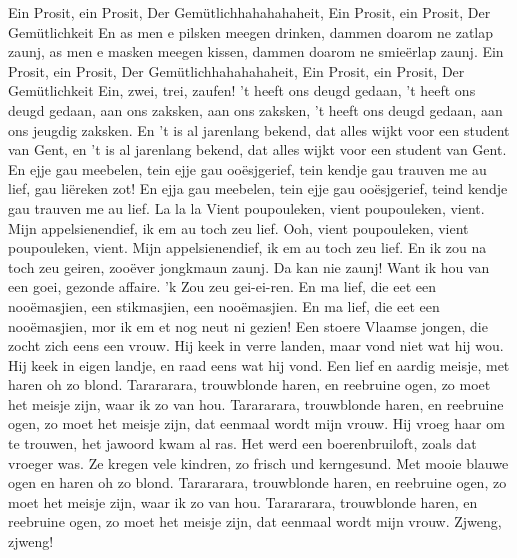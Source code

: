 \beginverse*
Ein Prosit, ein Prosit,
Der Gemütlichhahahahaheit,
Ein Prosit, ein Prosit,
Der Gemütlichkeit
\endverse
\beginverse*
En as men e pilsken meegen drinken,
dammen doarom ne zatlap zaunj,
as men e masken meegen kissen,
dammen doarom ne smieërlap zaunj.
\endverse
\beginchorus
Ein Prosit, ein Prosit,
Der Gemütlichhahahahaheit,
Ein Prosit, ein Prosit,
Der Gemütlichkeit
\endchorus
\beginverse*
Ein, zwei, trei, zaufen!
\endverse
\beginverse*
 't heeft ons deugd gedaan,
't heeft ons deugd gedaan,
aan ons zaksken,
aan ons zaksken,
't heeft ons deugd gedaan,
aan ons jeugdig zaksken.
\endverse
\beginverse*
En 't is al jarenlang bekend,
dat alles wijkt voor een student van Gent,
en 't is al jarenlang bekend,
dat alles wijkt voor een student van Gent.
\endverse
\beginverse*
En ejje gau meebelen,
tein ejje gau ooësjgerief,
tein kendje gau trauven me au lief,
gau liëreken zot!
En ejja gau meebelen,
tein ejje gau ooësjgerief,
teind kendje gau trauven me au lief.
\endverse
\beginverse*
La la la
\endverse
\beginverse*
Vient poupouleken,
vient poupouleken, vient.
Mijn appelsienendief,
ik em au toch zeu lief.
Ooh, vient poupouleken,
vient poupouleken, vient.
Mijn appelsienendief,
ik em au toch zeu lief.
\endverse
\beginverse*
En ik zou na toch zeu geiren,
zooëver jongkmaun zaunj.
Da kan nie zaunj!
Want ik hou van een goei,
gezonde affaire.
'k Zou zeu gei-ei-ren.
\endverse
\beginverse*
En ma lief, die eet een nooëmasjien,
een stikmasjien, een nooëmasjien.
En ma lief, die eet een nooëmasjien,
mor ik em et nog neut ni gezien!
\endverse
\beginverse*
Een stoere Vlaamse jongen,
die zocht zich eens een vrouw.
Hij keek in verre landen,
maar vond niet wat hij wou.
Hij keek in eigen landje,
en raad eens wat hij vond.
Een lief en aardig meisje,
met haren oh zo blond.
\endverse
\beginverse*
Tarararara, trouwblonde haren,
en reebruine ogen,
zo moet het meisje zijn,
waar ik zo van hou.
Tarararara, trouwblonde haren,
en reebruine ogen,
zo moet het meisje zijn,
dat eenmaal wordt mijn vrouw.
\endverse
\beginverse*
Hij vroeg haar om te trouwen,
het jawoord kwam al ras.
Het werd een boerenbruiloft,
zoals dat vroeger was.
Ze kregen vele kindren,
zo frisch und kerngesund.
Met mooie blauwe ogen 
en haren oh zo blond.
\endverse
\beginverse*
Tarararara, trouwblonde haren,
en reebruine ogen,
zo moet het meisje zijn,
waar ik zo van hou.
Tarararara, trouwblonde haren,
en reebruine ogen,
zo moet het meisje zijn,
dat eenmaal wordt mijn vrouw.
\endverse
\beginverse*
Zjweng, zjweng!
\endverse
\endsong